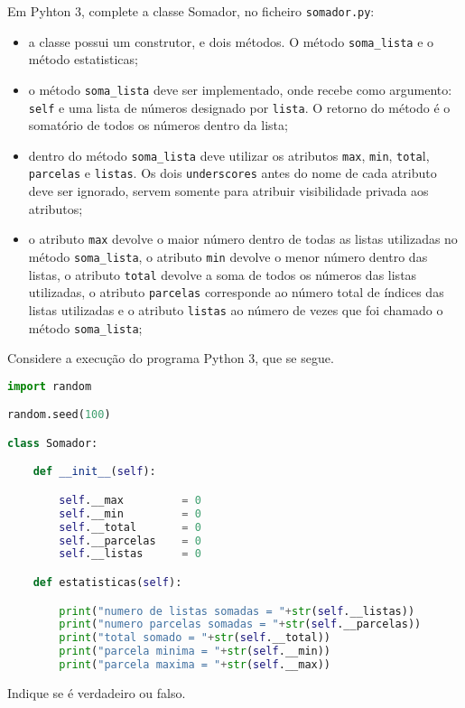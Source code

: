 \documentclass[12pt,varwidth=16cm,border=17pt]{standalone}
\begin{document}
Em Pyhton 3, complete a classe Somador, no ficheiro \verb+somador.py+:

\begin{itemize}
  \item a classe possui um construtor, e dois métodos. O método \verb+soma_lista+ e o método estatisticas;
  \item o método \verb+soma_lista+ deve ser implementado, onde recebe como argumento: \verb+self+ e uma lista de números designado por \verb+lista+. O retorno do método é o somatório de todos os números dentro da lista;
  \item dentro do método \verb+soma_lista+ deve utilizar os atributos \verb+max+, \verb+min+, \verb+tota+l, \verb+parcelas+ e \verb+listas+. Os dois \verb+underscores+ antes do nome de cada atributo deve ser ignorado, servem somente para atribuir visibilidade privada aos atributos;
  \item o atributo \verb+max+ devolve o maior número dentro de todas as listas utilizadas no método \verb+soma_lista+, o atributo \verb+min+ devolve o menor número dentro das listas, o atributo \verb+total+ devolve a soma de todos os números das listas utilizadas, o atributo \verb+parcelas+ corresponde ao número total de índices das listas utilizadas e o atributo \verb+listas+ ao número de vezes que foi chamado o método \verb+soma_lista+;
\end{itemize}

Considere a execução do programa Python 3, que se segue. 

\begin{lstlisting}[language=Python]
import random

random.seed(100)

class Somador:

	def __init__(self):

		self.__max         = 0
		self.__min         = 0
		self.__total       = 0
		self.__parcelas    = 0
		self.__listas      = 0

	def estatisticas(self):

		print("numero de listas somadas = "+str(self.__listas))
		print("numero parcelas somadas = "+str(self.__parcelas))
		print("total somado = "+str(self.__total))
		print("parcela minima = "+str(self.__min))
		print("parcela maxima = "+str(self.__max))
\end{lstlisting}

Indique se é verdadeiro ou falso.
\end{document}
